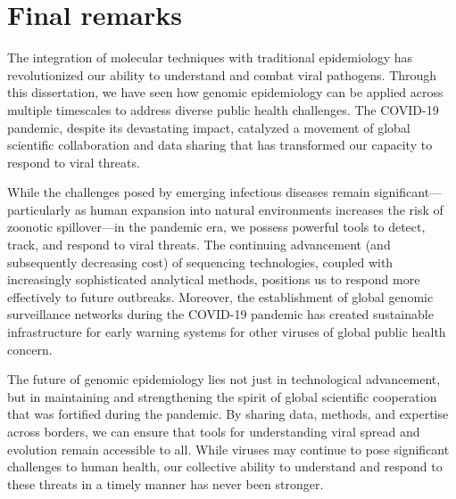 \section{Final remarks}
The integration of molecular techniques with traditional epidemiology has revolutionized our ability to understand and combat viral pathogens.
Through this dissertation, we have seen how genomic epidemiology can be applied across multiple timescales to address diverse public health challenges.
The COVID-19 pandemic, despite its devastating impact, catalyzed a movement of global scientific collaboration and data sharing that has transformed our capacity to respond to viral threats.

While the challenges posed by emerging infectious diseases remain significant---particularly as human expansion into natural environments increases the risk of zoonotic spillover---in the pandemic era, we possess powerful tools to detect, track, and respond to viral threats.
The continuing advancement (and subsequently decreasing cost) of sequencing technologies, coupled with increasingly sophisticated analytical methods, positions us to respond more effectively to future outbreaks.
Moreover, the establishment of global genomic surveillance networks during the COVID-19 pandemic has created sustainable infrastructure for early warning systems for other viruses of global public health concern.

The future of genomic epidemiology lies not just in technological advancement, but in maintaining and strengthening the spirit of global scientific cooperation that was fortified during the pandemic.
By sharing data, methods, and expertise across borders, we can ensure that tools for understanding viral spread and evolution remain accessible to all.
While viruses may continue to pose significant challenges to human health, our collective ability to understand and respond to these threats in a timely manner has never been stronger.

\cleardoublepage


